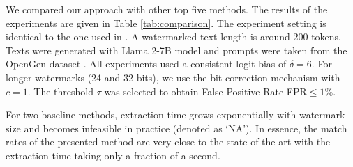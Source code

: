 \documentclass[a4paper,11pt]{llncs}
\begin{document}
We compared our approach with other top five methods. The results of the experiments are given in Table \ref{tab:comparison}. The experiment setting is identical to the one used in \cite{Qu:2024aa}. A watermarked text length is around 200 tokens. Texts were generated with Llama 2-7B model and prompts were taken from the OpenGen dataset \cite{opengendataset}. All experiments used a consistent logit bias of $\delta=6$. For longer watermarks (24 and 32 bits), we use the bit correction mechanism with $c=1$. The threshold $\tau$ was selected to obtain False Positive Rate FPR$\leq1\%$.
%
\begin{table}[h]
\centering
{}
\vspace{3mm}
\caption{Comparison of methods on match rate(\%) for different watermark lengths (in bits).}
\label{tab:comparison}
\end{table}

For two baseline methods, extraction time grows exponentially with watermark size and becomes infeasible in practice (denoted as `NA').
In essence, the match rates of the presented method are very close to the state-of-the-art \cite{Qu:2024aa,Fernandez2023ThreeBricks}  with the extraction time taking only a fraction of a second. 
\end{document}
